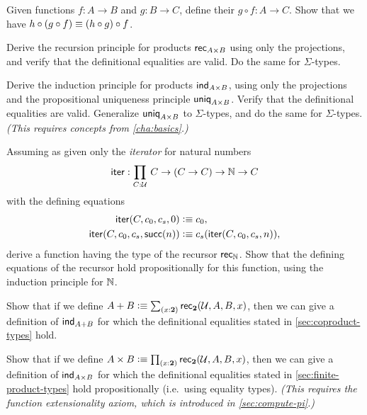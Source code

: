 \sectionExercises

\begin{ex}\label{ex:composition}
Given functions $f:A\to B$ and $g:B\to C$, define their 
%
%
$g\circ f:A\to C$.
%
Show that we have $h \circ (g\circ f) \equiv (h\circ g)\circ f$.
\end{ex}

\begin{ex}\label{ex:pr-to-rec}
Derive the recursion principle for products $\mathsf{rec}_{A\times B} $ using only the projections, and verify that the definitional equalities are valid.
Do the same for $\Sigma$-types.
\end{ex}

\begin{ex}\label{ex:pr-to-ind}
Derive the induction principle for products $\mathsf{ind}_{A\times B}$, using only the projections and the propositional uniqueness principle $\mathsf{uniq}_{A\times B}$.
Verify that the definitional equalities are valid.
Generalize $\mathsf{uniq}_{A\times B}$ to $\Sigma$-types, and do the same for $\Sigma$-types.
\emph{(This requires concepts from \cref{cha:basics}.)}
\end{ex}

\begin{ex}\label{ex:iterator}
Assuming as given only the \emph{iterator} for natural numbers
\[\ite : \prd{C:\UU} C \to (C \to C) \to \nat \to C \]
with the defining equations
\begin{align*}
    \mathsf{iter}(C,c_0,c_s,0)  &\vcentcolon\equiv c_0, \\
    \mathsf{iter}(C,c_0,c_s,\mathsf{succ}(n)) &\vcentcolon\equiv c_s(\mathsf{iter}(C,c_0,c_s,n)),
\end{align*}
derive a function having the type of the recursor $\mathsf{rec}_{\mathbb{N}}$.
Show that the defining equations of the recursor hold propositionally for this function, using the induction principle for $\mathbb{N}$.
\end{ex}

\begin{ex}\label{ex:sum-via-bool}
%
Show that if we define $A + B \defeq \sm{x:\bool} \rec{\bool}(\UU,A,B,x)$, then we can give a definition of $\mathsf{ind}_{A+B}$ for which the definitional equalities stated in \cref{sec:coproduct-types} hold.
\end{ex}

\begin{ex}\label{ex:prod-via-bool}
%
Show that if we define $A \times B \defeq \prd{x:\bool}\rec{\bool}(\UU,A,B,x)$, then we can give a definition of  $\mathsf{ind}_{A\times B}$ for which the definitional equalities stated in \cref{sec:finite-product-types} hold propositionally (i.e.\ using equality types).
\emph{(This requires the function extensionality axiom, which is introduced in \cref{sec:compute-pi}.)}
\end{ex}


